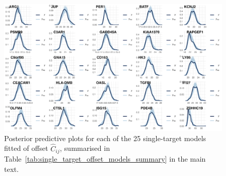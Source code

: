 \documentclass[../thesis.tex]{subfiles}
\begin{document}
\begin{figure}[!ht]
    \centering
    \includegraphics[width=\textwidth]{figures/chapter2/clinical_single_target_offset_posteriors_fig.png}
    \caption{Posterior predictive plots for each of the 25 single-target models fitted of offset $\hat{C}_{ij}$, summarised in Table~\ref{tab:single_target_offset_models_summary} in the main text.}
    \label{fig:clinical_single_target_offset_posteriors_fig}
\end{figure}

\newpage
\end{document}
